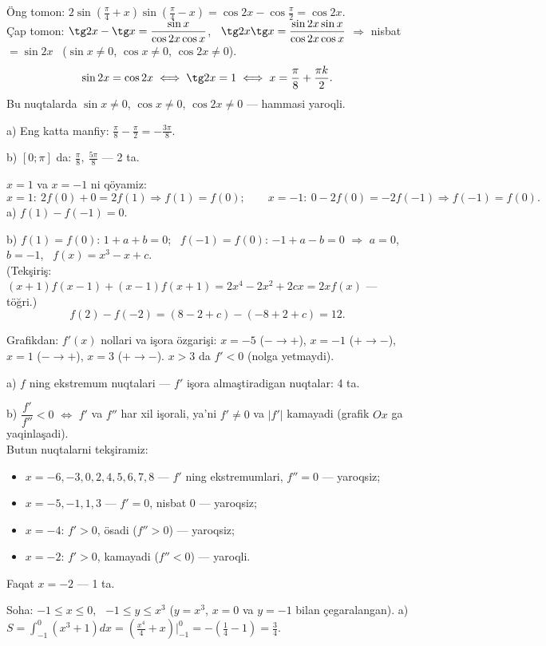 \newpage
{}
Öng tomon: $2\sin\left(\frac\pi4+x\right)\sin\left(\frac\pi4-x\right)=\cos2x-\cos\frac\pi2=\cos2x$.\\
Çap tomon: $\tg2x-\tg x=\dfrac{\sin x}{\cos2x\cos x}$, \ $\tg2x\tg x=\dfrac{\sin2x\sin x}{\cos2x\cos x}$ $\Rightarrow$ nisbat $=\sin2x$ \ ($\sin x\ne0$, $\cos x\ne0$, $\cos2x\ne0$).
\[\sin2x=\cos2x\iff\tg2x=1\iff x=\frac\pi8+\frac{\pi k}2.\]
Bu nuqtalarda $\sin x\ne0$, $\cos x\ne0$, $\cos2x\ne0$ — hammasi yaroqli.

a) Eng katta manfiy: $\frac\pi8-\frac\pi2=-\frac{3\pi}8$.

b) $[0;\pi]$ da: $\frac\pi8,\ \frac{5\pi}8$ — 2 ta.

\newpage
{}
$x=1$ va $x=-1$ ni qöyamiz:
\[x=1:\ 2f(0)+0=2f(1)\Rightarrow f(1)=f(0);\qquad x=-1:\ 0-2f(0)=-2f(-1)\Rightarrow f(-1)=f(0).\]
a) $f(1)-f(-1)=0$.

b) $f(1)=f(0)$: $1+a+b=0$; \ $f(-1)=f(0)$: $-1+a-b=0$ $\Rightarrow$ $a=0$, $b=-1$, \ $f(x)=x^3-x+c$.\\
(Tekşiriş: $(x+1)f(x-1)+(x-1)f(x+1)=2x^4-2x^2+2cx=2xf(x)$ — töğri.)
\[f(2)-f(-2)=(8-2+c)-(-8+2+c)=12.\]

\newpage
{}
Grafikdan: $f'(x)$ nollari va işora özgarişi: $x=-5$ ($-\to+$), $x=-1$ ($+\to-$), $x=1$ ($-\to+$), $x=3$ ($+\to-$). $x>3$ da $f'<0$ (nolga yetmaydi).

a) $f$ ning ekstremum nuqtalari — $f'$ işora almaştiradigan nuqtalar: 4 ta.

b) $\dfrac{f'}{f''}<0$ $\iff$ $f'$ va $f''$ har xil işorali, ya'ni $f'\ne0$ va $|f'|$ kamayadi (grafik $Ox$ ga yaqinlaşadi).\\
Butun nuqtalarni tekşiramiz:
\begin{itemize}\setlength{\itemsep}{0pt}
\item $x=-6,-3,0,2,4,5,6,7,8$ — $f'$ ning ekstremumlari, $f''=0$ — yaroqsiz;
\item $x=-5,-1,1,3$ — $f'=0$, nisbat $0$ — yaroqsiz;
\item $x=-4$: $f'>0$, ösadi ($f''>0$) — yaroqsiz;
\item $x=-2$: $f'>0$, kamayadi ($f''<0$) — yaroqli.
\end{itemize}
Faqat $x=-2$ — 1 ta.

\newpage
{}
Soha: $-1\le x\le0$, \ $-1\le y\le x^3$ ($y=x^3$, $x=0$ va $y=-1$ bilan çegaralangan).
a) $S=\displaystyle\int_{-1}^0\left(x^3+1\right)dx=\left(\frac{x^4}4+x\right)\Big|_{-1}^0=-\left(\frac14-1\right)=\frac34$.


